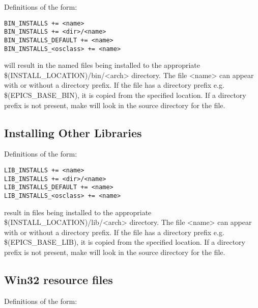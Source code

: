 Definitions of the form:

\begin{verbatim}BIN_INSTALLS += <name>
BIN_INSTALLS += <dir>/<name>
BIN_INSTALLS_DEFAULT += <name>
BIN_INSTALLS_<osclass> += <name>
\end{verbatim}will result in the named files being installed to the appropriate \$(INSTALL\_LOCATION)/bin/\textless{}arch\textgreater{} directory. The file 
\textless{}name\textgreater{} can appear with or without a directory prefix. If the file has a directory prefix e.g. \$(EPICS\_BASE\_BIN), it is 
copied from the specified location. If a directory prefix is not present, make will look in the source directory for the file.

\subsection{Installing Other Libraries}

Definitions of the form:

\begin{verbatim}LIB_INSTALLS += <name>
LIB_INSTALLS += <dir>/<name>
LIB_INSTALLS_DEFAULT += <name>
LIB_INSTALLS_<osclass> += <name>
\end{verbatim}result in files being installed to the appropriate \$(INSTALL\_LOCATION)/lib/\textless{}arch\textgreater{} directory. The file \textless{}name\textgreater{} can 
appear with or without a directory prefix. If the file has a directory prefix e.g. \$(EPICS\_BASE\_LIB), it is copied from the 
specified location. If a directory prefix is not present, make will look in the source directory for the file.

\subsection{Win32 resource files}

Definitions of the form:

